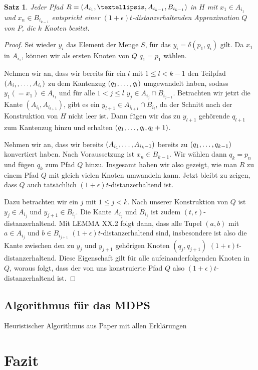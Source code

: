 \documentclass[11pt]{article}
\newtheorem{theorem}{Satz}[section]
\begin{document}
	\begin{theorem}
		\label{theo:H2Approx}
		Jeder Pfad $R = (A_{i_1}, \textellipsis, A_{i_{k-1}}, B_{i_{k-1}})$ in $H$ mit $x_1 \in A_{i_1}$ und $x_n \in B_{i_{k-1}}$ entspricht einer $(1+\epsilon)t$-distanzerhaltenden Approximation $Q$ von $P$, die $k$ Knoten besitzt.
	\end{theorem}
	\begin{proof}
		Sei wieder $y_i$ das Element der Menge $S$, für das $y_i = \delta(p_1, q_i)$ gilt.
		Da $x_1$ in $A_{i_1}$, können wir als ersten Knoten von $Q$ $q_1 = p_1$ wählen.
		
		Nehmen wir an, dass wir bereits für ein $l$ mit $1 \leq l < k-1$ den Teilpfad $(A_{i_1}, \mathellipsis, A_{i_l})$ zu dem Kantenzug $(q_1, \mathellipsis, q_l)$ umgewandelt haben, sodass $y_1 (= x_1) \in A_{i_1}$ und für alle $1 < j \leq l$ $y_j \in A_{i_j} \cap B_{i_{j-1}}$. Betrachten wir jetzt die Kante $(A_{i_l}, A_{i_{l+1}})$, gibt es ein $y_{l+1} \in A_{i_{l+1}} \cap B_{i_l}$, da der Schnitt nach der Konstruktion von $H$ nicht leer ist. Dann fügen wir das zu $y_{l+1}$ gehörende $q_{l+1}$ zum Kantenzug hinzu und erhalten $(q_1, \mathellipsis, q_l, q_l+1)$.
		
		Nehmen wir an, dass wir bereits $(A_{i_1}, \mathellipsis, A_{i_k-1})$ bereits zu $(q_1, \mathellipsis, q_{k-1})$ konvertiert haben. Nach Voraussetzung ist $x_n \in B_{k-1}$. Wir wählen dann $q_k = p_n$ und fügen $q_k$ zum Pfad $Q$ hinzu. 
		Insgesamt haben wir also gezeigt, wie man $R$ zu einem Pfad $Q$ mit gleich vielen Knoten umwandeln kann. Jetzt bleibt zu zeigen, dass $Q$ auch tatsächlich $(1+\epsilon)t$-distanzerhaltend ist.
		
		Dazu betrachten wir ein $j$ mit $1 \leq j < k$. Nach unserer Konstruktion von $Q$ ist $y_j \in A_{i_j}$ und $y_{j+1} \in B_{i_j}$. Die Kante $A_{i_j}$ und $B_{i_j}$ ist zudem $(t, \epsilon)$-distanzerhaltend. Mit LEMMA XX.2 folgt dann, dass alle Tupel $(a, b)$ mit $a \in A_{i_j}$ und $b \in B_{i_{j+1}}$ $(1+\epsilon)t$-distanzerhaltend sind, insbesondere ist also die Kante zwischen den zu $y_j$ und $y_{j+1}$ gehörigen Knoten $(q_j, q_{j+1})$ $(1+\epsilon)t$-distanzerhaltend. Diese Eigenschaft gilt für alle aufeinanderfolgenden Knoten in $Q$, woraus folgt, dass der von uns konstruierte Pfad $Q$ also $(1+\epsilon)t$-distanzerhaltend ist.
	\end{proof}
    
    \subsection{Algorithmus für das MDPS}
    \label{subsec:mdps}
    Heuristischer Algorithmus aus Paper mit allen Erklärungen

    \section{Fazit}
    \label{sec:fazit}

    
    
\end{document}
